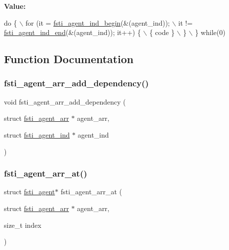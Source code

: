 {\bfseries Value\+:}
\begin{DoxyCode}
\textcolor{keywordflow}{do} \{                           \(\backslash\)
        for (it = \mbox{\hyperlink{fsti-agent_8h_af8ec082c043d0719f2933f78c9b74879}{fsti\_agent\_ind\_begin}}(&(agent\_ind));                   \(\backslash\)
             it != \mbox{\hyperlink{fsti-agent_8h_a0a007fca1a85b26dc9f890b5c9f5649a}{fsti\_agent\_ind\_end}}(&(agent\_ind)); it++) \{            \(\backslash\)
            \{ code \}                                                    \(\backslash\)
        \}                                                               \(\backslash\)
    \} \textcolor{keywordflow}{while}(0)
\end{DoxyCode}


\subsection{Function Documentation}
\mbox{\label{fsti-agent_8h_a63a22afc13737a55174adb97f2cbcfc1}} 
\subsubsection{\texorpdfstring{fsti\+\_\+agent\+\_\+arr\+\_\+add\+\_\+dependency()}{fsti\_agent\_arr\_add\_dependency()}}
{\footnotesize\ttfamily void fsti\+\_\+agent\+\_\+arr\+\_\+add\+\_\+dependency (\begin{DoxyParamCaption}\item[{struct \mbox{\hyperlink{structfsti__agent__arr}{fsti\+\_\+agent\+\_\+arr}} $\ast$}]{agent\+\_\+arr,  }\item[{struct \mbox{\hyperlink{structfsti__agent__ind}{fsti\+\_\+agent\+\_\+ind}} $\ast$}]{agent\+\_\+ind }\end{DoxyParamCaption})}

\mbox{\label{fsti-agent_8h_a9f01e2df0acb48b1e9cef63d4314c209}} 
\subsubsection{\texorpdfstring{fsti\+\_\+agent\+\_\+arr\+\_\+at()}{fsti\_agent\_arr\_at()}}
{\footnotesize\ttfamily struct \mbox{\hyperlink{structfsti__agent}{fsti\+\_\+agent}}$\ast$ fsti\+\_\+agent\+\_\+arr\+\_\+at (\begin{DoxyParamCaption}\item[{struct \mbox{\hyperlink{structfsti__agent__arr}{fsti\+\_\+agent\+\_\+arr}} $\ast$}]{agent\+\_\+arr,  }\item[{size\+\_\+t}]{index }\end{DoxyParamCaption})}

